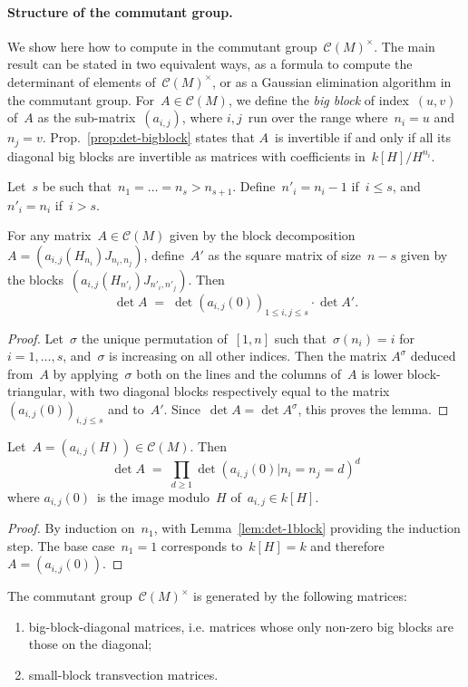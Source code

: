\documentclass{lms}%
\let\ro\mathscr
\begin{document}
\paragraph{Structure of the commutant group.}%

We show here how to compute in the commutant group~$\ro C(M)^{×}$. The
main result can be stated in two equivalent ways, as a formula to compute
the determinant of elements of~$\ro C(M)^{×}$, or as a Gaussian
elimination algorithm in the commutant group. For~$A ∈ \ro C(M)$, we
define the \emph{big block} of index~$(u,v)$ of~$A$ as the
sub-matrix~$(a_{i,j})$, where $i,j$~run over the range where~$n_i = u$
and~$n_j = v$. Prop.~\ref{prop:det-bigblock} states that $A$~is
invertible if and only if all its diagonal big blocks are invertible as
matrices with coefficients in~$k[H]/H^{n_i}$.

\begin{lem}\label{lem:det-1block}%
Let~$s$ be such that~$n_1 = … = n_s > n_{s+1}$.
Define~$n'_i = n_i - 1$ if~$i ≤ s$, and~$n'_i = n_i$ if~$i > s$.

For any matrix~$A ∈ \ro C(M)$ given by the block decomposition~$A =
(a_{i,j}(H_{n_i}) J_{n_i,n_j})$, define~$A'$ as the square matrix of
size~$n - s$ given by the blocks~$(a_{i,j}(H_{n'_i}) J_{n'_i,
n'_j})$.
Then \[ \det A \;=\; \det (a_{i,j}(0))_{1 ≤ i,j ≤ s} · \det A'. \]
\end{lem}

\begin{proof}
Let~$σ$ the unique permutation of~$[1,n]$ such that~$σ(n_i) = i$ for~$i =
1, …, s$, and~$σ$ is increasing on all other indices. Then the matrix
$A^{σ}$ deduced from~$A$ by applying~$σ$ both on the lines and the
columns of~$A$ is lower block-triangular, with two diagonal blocks
respectively equal to the matrix~$(a_{i,j}(0))_{i,j ≤ s}$ and to~$A'$.
Since~$\det A = \det A^{σ}$, this proves the lemma.
\end{proof}
\begin{prop}\label{prop:det-bigblock}%
Let~$A = (a_{i,j}(H)) ∈ \ro C(M)$. Then
\[ \det A \;=\; ∏_{d ≥ 1} \det (a_{i,j}(0) | n_{i} = n_j = d)^{d} \]
where $a_{i,j}(0)$~is the image modulo~$H$ of~$a_{i,j} ∈ k[H]$.
\end{prop}

\begin{proof}
By induction on~$n_1$, with Lemma~\ref{lem:det-1block} providing the
induction step. The base case~$n_1 = 1$ corresponds to~$k[H] = k$ and
therefore~$A = (a_{i,j}(0))$.
\end{proof}
\begin{prop}\label{prop:structure-gl}%
The commutant group~$\ro C(M)^{×}$ is
generated by the following matrices:
\begin{enumerate}
\item big-block-diagonal matrices, i.e. matrices whose only non-zero big
blocks are those on the diagonal;
\item small-block transvection matrices.
\end{enumerate}
\end{prop}
\end{document}
